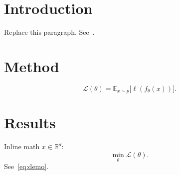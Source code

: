 \section{Introduction}
\label{sec:intro}

Replace this paragraph. See~\cite{rosepine2026}.

\section{Method}

\begin{formulabox}
\[
  \mathcal{L}(\theta) = \mathbb{E}_{x\sim p}\bigl[\ell(f_\theta(x))\bigr].
\]
\end{formulabox}

\section{Results}

Inline math $x \in \mathbb{R}^d$:
\begin{equation}
  \label{eq:demo}
  \min_{\theta} \mathcal{L}(\theta).
\end{equation}
See~\eqref{eq:demo}.
